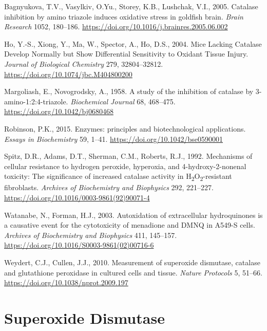 \documentclass[
  9pt,
  american,
  a5paper,
  extrafontsizes,onecolumn,openright
  ]{memoir}
\makeatletter
\newcommand{\MemoirChapStyle}{daleif1}
\newcommand{\MemoirPageStyle}{Ruled}
\newlength\widthw %
\newcommand*{\SmallMargins}{
  \setlrmarginsandblock{0.75in}{0.75in}{*}
  \setmarginnotes{0.1in}{0.1in}{0.1in}
 \setulmarginsandblock{0.75in}{0.75in}{*}
  \checkandfixthelayout
  \ch@ngetext
  \clearpage
  \setlength{\widthw}{\textwidth+\marginparsep+\marginparwidth}
  \footnotesatfoot
  \chapterstyle{\MemoirChapStyle}  %
  \pagestyle{\MemoirPageStyle}
}
\makeatother
\begin{document}
Bagnyukova, T.V., Vasylkiv, O.Yu., Storey, K.B., Lushchak, V.I., 2005. Catalase inhibition by amino triazole induces oxidative stress in goldfish brain. \emph{Brain Research} 1052, 180--186. \url{https://doi.org/10.1016/j.brainres.2005.06.002}

Ho, Y.-S., Xiong, Y., Ma, W., Spector, A., Ho, D.S., 2004. Mice Lacking Catalase Develop Normally but Show Differential Sensitivity to Oxidant Tissue Injury. \emph{Journal of Biological Chemistry} 279, 32804--32812. \url{https://doi.org/10.1074/jbc.M404800200}

Margoliash, E., Novogrodsky, A., 1958. A study of the inhibition of catalase by 3-amino-1:2:4-triazole. \emph{Biochemical Journal} 68, 468--475. \url{https://doi.org/10.1042/bj0680468}

Robinson, P.K., 2015. Enzymes: principles and biotechnological applications. \emph{Essays in Biochemistry} 59, 1--41. \url{https://doi.org/10.1042/bse0590001}

Spitz, D.R., Adams, D.T., Sherman, C.M., Roberts, R.J., 1992. Mechanisms of cellular resistance to hydrogen peroxide, hyperoxia, and 4-hydroxy-2-nonenal toxicity: The significance of increased catalase activity in H\textsubscript{2}O\textsubscript{2}-resistant fibroblasts. \emph{Archives of Biochemistry and Biophysics} 292, 221--227. \url{https://doi.org/10.1016/0003-9861(92)90071-4}

Watanabe, N., Forman, H.J., 2003. Autoxidation of extracellular hydroquinones is a causative event for the cytotoxicity of menadione and DMNQ in A549-S cells. \emph{Archives of Biochemistry and Biophysics} 411, 145--157. \url{https://doi.org/10.1016/S0003-9861(02)00716-6}

Weydert, C.J., Cullen, J.J., 2010. Measurement of superoxide dismutase, catalase and glutathione peroxidase in cultured cells and tissue. \emph{Nature Protocols} 5, 51--66. \url{https://doi.org/10.1038/nprot.2009.197}

\chapter{Superoxide Dismutase}\label{superoxide-dismutase}



\backmatter
\SmallMargins

\printbibliography
\onecolumn


\end{document}
